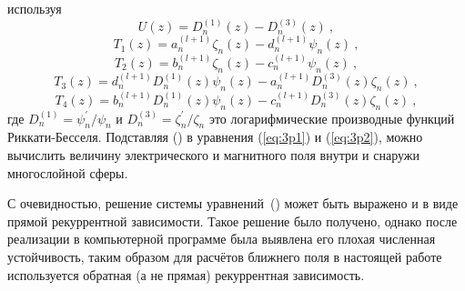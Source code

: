 используя
\begin{equation*}
  U(z) =    {D^{(1)}_{n}}(z) - {D^{(3)}_{n}}(z)\:,
\end{equation*}
\begin{equation*}
  T_1(z) =   a^{(l+1)}_{n}  \zeta_{n}(z) 
           - d^{(l+1)}_{n}  \psi_{n}(z)\:,
\end{equation*}
\begin{equation*}
  T_2(z) =   b^{(l+1)}_{n}  \zeta_{n}(z) 
           - c^{(l+1)}_{n}  \psi_{n}(z)\:,
\end{equation*}
\begin{equation*}
  T_3(z) =  d^{(l+1)}_{n}  D^{(1)}_{n}(z)  \psi_{n}(z) 
          - a^{(l+1)}_{n}  D^{(3)}_{n}(z)  \zeta_{n} (z)\:,
\end{equation*}
\begin{equation*}
  T_4(z) =  b^{(l+1)}_{n}  D^{(1)}_{n}(z)  \psi_{n}(z) 
          - c^{(l+1)}_{n}  D^{(3)}_{n}(z)  \zeta_{n} (z)\:,
\end{equation*}
где  $D^{(1)}_{n} = \psi^{\prime}_{n}/\psi_{n}$ и
$D^{(3)}_{n} = \zeta^{\prime}_{n}/\zeta_{n}$ это логарифмические
производные функций Риккати-Бесселя. Подставляя
() в уравнения (\ref{eq:3p1}) и
(\ref{eq:3p2}), можно вычислить величину электрического и магнитного
поля внутри и снаружи многослойной сферы.

С очевидностью, решение системы
уравнений~() может быть
выражено и в виде прямой рекуррентной зависимости. Такое решение было
получено, однако после реализации в компьютерной программе была
выявлена его плохая численная устойчивость, таким образом для расчётов
ближнего поля в настоящей работе используется обратная (а не прямая)
рекуррентная зависимость.

